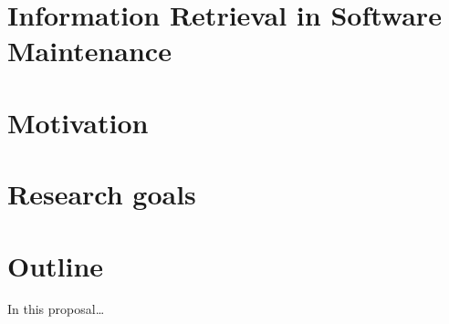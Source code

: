 \section{Information Retrieval in Software
Maintenance}\label{information-retrieval-in-software-maintenance}

\section{Motivation}\label{motivation}

\section{Research goals}\label{research-goals}

\section{Outline}\label{outline}

In this proposal\ldots{}
